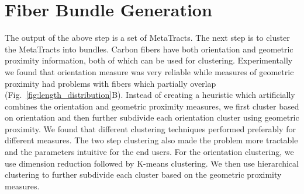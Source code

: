 \section {Fiber Bundle Generation}
\label{subsec:fiber-bundles}

The output of the above step is a set of MetaTracts. The next step is to cluster the MetaTracts into bundles. 
Carbon fibers have both orientation and geometric proximity information, both of which can be used for clustering. Experimentally we found that orientation measure was very reliable while measures of geometric proximity had problems with fibers which partially overlap (Fig.~\ref{fig:length_distribution}B).  
Instead of creating a heuristic which artificially combines the orientation and geometric proximity measures, we first cluster based on orientation and then further subdivide each orientation cluster using geometric proximity.
We found that different clustering techniques performed preferably for different measures.  The two step clustering also made the problem more tractable and  the parameters intuitive for the end users. For the orientation clustering, we use dimension reduction followed by K-means clustering. We then use hierarchical clustering to further subdivide each cluster based on the geometric proximity measures. 



